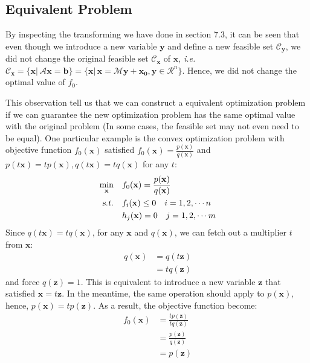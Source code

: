 \documentclass[10pt,a4paper]{article}
\begin{document}
\subsection{Equivalent Problem}
By inspecting the transforming we have done in section 7.3, it can be seen that even though we introduce a new variable $\mathbf{y}$ and define a new feasible set $\mathcal{C}_{\mathbf{y}}$, we did not change the original feasible set $\mathcal{C}_{\mathbf{x}}$ of $\mathbf{x}$, \textsl{i.e.} $\mathcal{C}_{\mathbf{x}} = \{ \mathbf{x} |\, \mathcal{A} \mathbf{x} = \mathbf{b} \} =  \{ \mathbf{x} |\, \mathbf{x} = \mathcal{M} \mathbf{y} + \mathbf{x_{0}}, \mathbf{y} \in \mathcal{R}^{n} \}$. Hence, we did not change the optimal value of $f_{0}$. 

This observation tell us that we can construct a equivalent optimization problem if we can guarantee the new optimization problem has the same optimal value with the original problem (In some cases, the feasible set may not even need to be equal). One particular example is the convex optimization problem with objective function $f_{0}(\mathbf{x})$ satisfied $f_{0}(\mathbf{x}) = \frac{p(\mathbf{x})}{q(\mathbf{x})}$ and $p(t \mathbf{x}) = t p(\mathbf{x}), q(t \mathbf{x}) = t q(\mathbf{x})$ for any $t$:
\begin{equation*}
	\begin{aligned}
		\displaystyle \min_{\mathbf{x}} \quad & f_{0}(\mathbf{x}) = \frac{p(\mathbf{x})}{q(\mathbf{x})} \\
		\textsl{s.t.} \quad & f_{i}(\mathbf{x}) \leq 0 \quad i = 1, 2, \cdots n \\
		& h_{j}(\mathbf{x}) = 0 \quad j = 1, 2, \cdots m
	\end{aligned}
\end{equation*}
Since $q(t \mathbf{x}) = t q(\mathbf{x})$, for any $\mathbf{x}$ and $q(\mathbf{x})$, we can fetch out a multiplier $t$ from $\mathbf{x}$:
\begin{equation*}
	\begin{aligned}
		q(\mathbf{x}) &= q(t \mathbf{z}) \\
		&= t q(\mathbf{z})
	\end{aligned}
\end{equation*}
and force $q(\mathbf{z}) = 1$. This is equivalent to introduce a new variable $\mathbf{z}$ that satisfied $\mathbf{x} = t \mathbf{z}$. In the meantime, the same operation should apply to $p(\mathbf{x})$, hence, $p(\mathbf{x}) = t p(\mathbf{z})$. As a result, the objective function become:
\begin{equation}
	\begin{aligned}
		f_{0}(\mathbf{x}) &= \frac{t p(\mathbf{z})}{t q(\mathbf{z})} \\
		&= \frac{p(\mathbf{z})}{q(\mathbf{z})} \\
		&= p(\mathbf{z})
	\end{aligned}
	\label{equivalent}
\end{equation}
\end{document}
